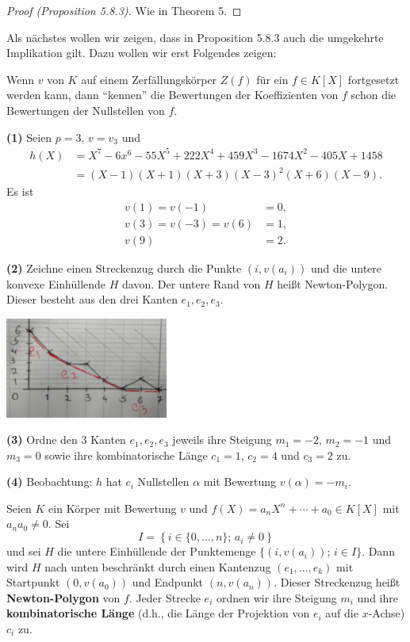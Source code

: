 \begin{proof}[Proof (Proposition 5.8.3)]
	Wie in Theorem 5.
\end{proof}

Als nächstes wollen wir zeigen, dass in Proposition 5.8.3 auch die umgekehrte Implikation gilt.
Dazu wollen wir erst Folgendes zeigen:

\bigskip Wenn $v$ von $K$ auf einem Zerfällungskörper $Z(f)$ für ein $f\in K[X]$ fortgesetzt werden kann, dann \enquote{kennen} die Bewertungen der Koeffizienten von $f$ schon die Bewertungen der Nullstellen von $f$.

\begin{Bsp}
	\textbf{(1)} Seien $p=3$, $v= v_3$ und
	\begin{align*}
	h(X)
	&= X^7-6x^6-55X^5+222X^4 +459X^3-1674X^2-405X+1458 \\
	&=(X-1)(X+1)(X+3)(X-3)^2(X+6)(X-9).
	\end{align*}
	Es ist
	\begin{align*}
	v(1)=v(-1)&=0, \\
	v(3)=v(-3)=v(6)&=1, \\
	v(9)&=2.
	\end{align*}
	
	\bigskip \textbf{(2)} Zeichne einen Streckenzug durch die Punkte $(i,v(a_i))$ 
	und die untere konvexe Einhüllende $H$ davon. Der untere Rand von $H$ heißt Newton-Polygon. Dieser besteht aus den drei Kanten $e_1, e_2, e_3$.
	\begin{center}
		\includegraphics[width=0.4\textwidth]{img/newton_polynomial.png}
	\end{center}
	
	\bigskip \textbf{(3)} Ordne den $3$ Kanten  $e_1, e_2, e_3$ jeweils ihre Steigung $m_1=-2$, $m_2 = -1$ und $m_3=0$ sowie ihre kombinatorische Länge $c_1 = 1$, $c_2 =4$ und $c_3 = 2$ zu.
	
	\bigskip \textbf{(4)} Beobachtung: $h$ hat $c_i$ Nullstellen $\alpha$ mit Bewertung $v(\alpha) = -m_i$.
\end{Bsp}

\begin{defi}
	Seien $K$ ein Körper mit Bewertung $v$ und $f(X)=a_nX^n+ \cdots + a_0 \in K[X]$ mit $a_n a_0 \neq 0$. Sei
	\[ I = \left\{
		i \in \{ 0, \dots, n \}; \, a_i \neq 0
	\right\}
	\]
	und sei $H$ die untere Einhüllende der Punktemenge $\{ (i,v(a_i)); \, i \in I  \}$. Dann wird $H$ nach unten beschränkt durch einen Kantenzug $(e_1, \dots, e_k)$ mit Startpunkt $(0,v(a_0))$ und Endpunkt $(n,v(a_n))$. Dieser Streckenzug heißt \textbf{Newton-Polygon} von $f$.
	Jeder Strecke $e_i$ ordnen wir ihre Steigung $m_i$ und ihre \textbf{kombinatorische Länge}
	(d.h., die Länge der Projektion von $e_i$ auf die $x$-Achse) $c_i$ zu.
\end{defi}

